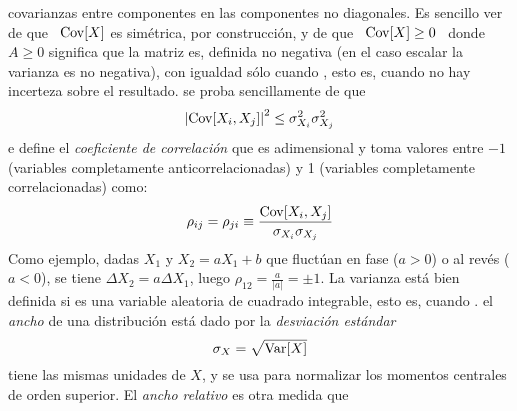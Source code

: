 \begin{itemize}
\begin{enumerate}
{  covarianzas entre  componentes en las componentes no  diagonales.  Es sencillo
  ver de que \ $\operatorname{Cov}[X]$ es sim\'etrica, por construcci\'on, y de que \ $\operatorname{Cov}[X]
  \ge 0$ \ donde $A \ge 0$  significa que la matriz es, definida no negativa (en
  el  caso escalar  la varianza  es no  negativa), con  igualdad}  s\'olo cuando
,  esto  es, cuando  no  hay
incerteza    sobre    el     resultado.        se  proba   sencillamente   de  que   $$\left|
  \operatorname{Cov}[X_i,X_j] \right|^2  \le \sigma_{X_i}^2 \sigma_{X_j}^2$$  e  define   el {\it  coeficiente de  correlaci\'on}  que es
adimensional    y   toma   valores    entre   $-1$    (variables   completamente
anticorrelacionadas) y 1 (variables completamente correlacionadas) como:
  \[
  \rho_{ij} = \rho_{ji} \equiv \frac{\operatorname{Cov}[X_i,X_j]}{\sigma_{X_i} \sigma_{X_j}}
  \]
  Como ejemplo, dadas $X_1$ y $X_2 = a X_1 + b$ que fluct\'uan en fase ($a>0$) o
  al rev\'es ($a<0$),  se tiene $\Delta X_2 = a \Delta  X_1$, luego $\rho_{12} =
  \frac{a}{|a|}   =  \pm   1$.\newline   {}  La varianza est\'a bien definida
  si  es una variable  aleatoria de cuadrado integrable, esto es,
  cuando   .      el {\it
    ancho}  de   una  distribuci\'on  est\'a  dado  por   la  {\it  desviaci\'on
    est\'andar}
  \[
  \sigma_X = \sqrt{\operatorname{Var}[X]}
  \]
  tiene  las mismas  unidades de  $X$,  y se  usa para  normalizar los  momentos
  centrales  de orden  superior.  El  {\it ancho  relativo} es  otra  medida que

\end{enumerate}
\end{itemize}
